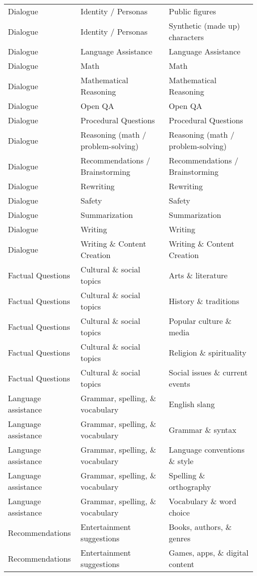 \begin{longtable}{|l|l|l|}
Dialogue & Identity / Personas & Public figures \\
Dialogue & Identity / Personas & Synthetic (made up) characters \\
Dialogue & Language Assistance & Language Assistance \\
Dialogue & Math & Math \\
Dialogue & Mathematical Reasoning & Mathematical Reasoning \\
Dialogue & Open QA & Open QA \\
Dialogue & Procedural Questions & Procedural Questions \\
Dialogue & Reasoning (math / problem-solving) & Reasoning (math / problem-solving) \\
Dialogue & Recommendations / Brainstorming & Recommendations / Brainstorming \\
Dialogue & Rewriting & Rewriting \\
Dialogue & Safety & Safety \\
Dialogue & Summarization & Summarization \\
Dialogue & Writing & Writing \\
Dialogue & Writing \& Content Creation & Writing \& Content Creation \\
Factual Questions & Cultural \& social topics & Arts \& literature \\
Factual Questions & Cultural \& social topics & History \& traditions \\
Factual Questions & Cultural \& social topics & Popular culture \& media \\
Factual Questions & Cultural \& social topics & Religion \& spirituality \\
Factual Questions & Cultural \& social topics & Social issues \& current events \\
Language assistance & Grammar, spelling, \& vocabulary & English slang \\
Language assistance & Grammar, spelling, \& vocabulary & Grammar \& syntax \\
Language assistance & Grammar, spelling, \& vocabulary & Language conventions \& style \\
Language assistance & Grammar, spelling, \& vocabulary & Spelling \& orthography \\
Language assistance & Grammar, spelling, \& vocabulary & Vocabulary \& word choice \\
Recommendations & Entertainment suggestions & Books, authors, \& genres \\
Recommendations & Entertainment suggestions & Games, apps, \& digital content \\

\end{longtable}
